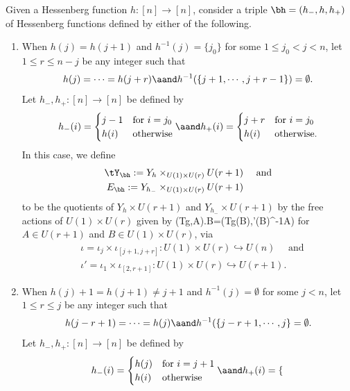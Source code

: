 \begin{definition}\label{43}
	Given a Hessenberg function $h:[n]\to [n]$, consider a triple $\bh=(h_-,h,h_+)$ of Hessenberg functions 
	defined by either of the following.
	\begin{enumerate}
		\item When $h(j)=h(j+1)$ and $h^{-1}(j)=\{j_0\}$ for some $1\leq j_0<j<n$, let $1\leq r\leq n-j $ be any integer such that
		\[h(j)=\cdots =h(j+r) \aand h^{-1}(\{j+1,\cdots, j+r-1\})=\emptyset.\] 
		Let $h_-, h_+:[n]\to [n]$ be defined by
		\[h_-(i)=\begin{cases}
			j-1 & \text{for }i=j_0\\
			h(i) &\text{otherwise}
		\end{cases} 
		\aand h_+(i)=\begin{cases}
			j+r &\text{for }i=j_0\\
			h(i) & \text{otherwise.}
		\end{cases} \]
		In this case, we define
		\begin{equation*}
			\begin{split}
				\tY_\bh :=Y_h\times _{U(1)\times U(r)}U(r+1)& \quad \text{ and}\\
				E_\bh:=Y_{h_-}\times_{U(1)\times U(r)}U(r+1)&
			\end{split}
		\end{equation*}
		to be the quotients of $Y_{h}\times U(r+1)$ and $Y_{h_-}\times U(r+1)$ by the free actions of $U(1)\times U(r)$ given by
		\beq \label{36} (Tg,A).B=(Tg\iota(B),\iota'(B)^{-1}A)\eeq 
		for $A\in U(r+1)$ and $B\in U(1)\times U(r)$,
		via 
		\begin{equation*}
			\begin{split}
				&\iota=\iota_j\times \iota_{[j+1,j+r]}:U(1)\times U(r)\hookrightarrow U(n)\quad \text{ and}\\
				&\iota'=\iota_1\times \iota_{[2,r+1]}:U(1)\times U(r)\hookrightarrow U(r+1).
			\end{split}
		\end{equation*}
		\item When $h(j)+1=h(j+1)\neq j+1$ and $h^{-1}(j)=\emptyset$ for some $j<n$, let $1\leq r\leq j$ be any integer such that 
		\[ h(j-r+1)=\cdots =h(j) \aand h^{-1}(\{j-r+1,\cdots, j\}=\emptyset.\]
		Let $h_-,h_+ :[n]\to [n]$ be defined by 
		\[h_-(i)=\begin{cases}
			h(j) &\text{for }i=j+1\\
			h(i) &\text{otherwise}
		\end{cases} 
		\aand h_+(i)=\begin{cases}

\end{cases}\]
\end{enumerate}
\end{definition}
